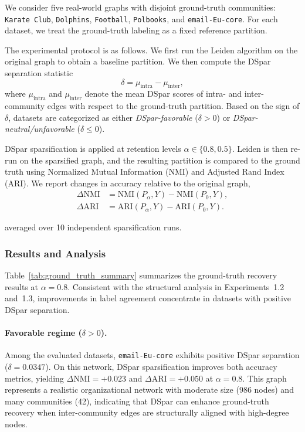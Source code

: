 \documentclass[10pt,journal,compsoc]{IEEEtran}
\begin{document}
We consider five real-world graphs with disjoint ground-truth communities: \texttt{Karate Club}, \texttt{Dolphins}, \texttt{Football}, \texttt{Polbooks}, and \texttt{email-Eu-core}.
For each dataset, we treat the ground-truth labeling as a fixed reference partition.

The experimental protocol is as follows.
We first run the Leiden algorithm on the original graph to obtain a baseline partition.
We then compute the DSpar separation statistic
\[
\delta = \mu_{\mathrm{intra}} - \mu_{\mathrm{inter}},
\]
where $\mu_{\mathrm{intra}}$ and $\mu_{\mathrm{inter}}$ denote the mean DSpar scores of intra- and inter-community edges with respect to the ground-truth partition.
Based on the sign of $\delta$, datasets are categorized as either \emph{DSpar-favorable} ($\delta > 0$) or \emph{DSpar-neutral/unfavorable} ($\delta \le 0$).

DSpar sparsification is applied at retention levels $\alpha \in \{0.8, 0.5\}$.
Leiden is then re-run on the sparsified graph, and the resulting partition is compared to the ground truth using Normalized Mutual Information (NMI) and Adjusted Rand Index (ARI).
We report changes in accuracy relative to the original graph,
\begin{equation}
\begin{aligned}
\Delta \mathrm{NMI} &= \mathrm{NMI}(P_\alpha, Y)
                     - \mathrm{NMI}(P_0, Y), \\
\Delta \mathrm{ARI} &= \mathrm{ARI}(P_\alpha, Y)
                     - \mathrm{ARI}(P_0, Y).
\end{aligned}
\end{equation}

averaged over 10 independent sparsification runs.

\subsubsection{Results and Analysis}

Table~\ref{tab:ground_truth_summary} summarizes the ground-truth recovery results at $\alpha=0.8$.
Consistent with the structural analysis in Experiments~1.2 and~1.3, improvements in label agreement concentrate in datasets with positive DSpar separation.

\paragraph{Favorable regime ($\delta > 0$).}
Among the evaluated datasets, \texttt{email-Eu-core} exhibits positive DSpar separation ($\delta = 0.0347$).
On this network, DSpar sparsification improves both accuracy metrics, yielding
$\Delta \mathrm{NMI} = +0.023$ and $\Delta \mathrm{ARI} = +0.050$ at $\alpha=0.8$.
This graph represents a realistic organizational network with moderate size (986 nodes) and many communities (42), indicating that DSpar can enhance ground-truth recovery when inter-community edges are structurally aligned with high-degree nodes.
\end{document}
